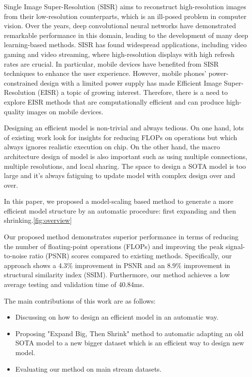 \documentclass[10pt,twocolumn,letterpaper]{article}
\begin{document}
Single Image Super-Resolution (SISR) aims to reconstruct high-resolution images from their low-resolution counterparts, which is an ill-posed problem in computer vision. Over the years, deep convolutional neural networks have demonstrated remarkable performance in this domain, leading to the development of many deep learning-based methods. SISR has found widespread applications, including video gaming and video streaming, where high-resolution displays with high refresh rates are crucial. In particular, mobile devices have benefited from SISR techniques to enhance the user experience. However, mobile phones' power-constrained design with a limited power supply has made Efficient Image Super-Resolution (EISR) a topic of growing interest. Therefore, there is a need to explore EISR methods that are computationally efficient and can produce high-quality images on mobile devices.

Designing an efficient model is non-trivial and always tedious. On one hand, lots of existing work look for insights for reducing FLOPs on operations but which always ignores realistic execution on chip\cite{sandler2018mobilenetv2}\cite{chen2023run}. On the other hand, the macro architecture design of model is also important such as using multiple connections\cite{chollet2017xception}, multiple resolutions\cite{girshick2015fast}, and local sharing\cite{liu2021swin}. The space to design a SOTA model is too large and it's always fatiguing to update model with complex design over and over.

In this paper, we proposed a model-scaling based method to generate a more efficient model structure by an automatic procedure: first expanding and then shrinking.\ref{fig:overview}

Our proposed method demonstrates superior performance in terms of reducing the number of floating-point operations (FLOPs) and improving the peak signal-to-noise ratio (PSNR) scores compared to existing methods. Specifically, our approach shows a 4.3\% improvement in PSNR and an 8.9\% improvement in structural similarity index (SSIM). Furthermore, our method achieves a low average testing and validation time of 40.84ms.

The main contributions of this work are as follows:

\begin{itemize}
    \item Discussing on how to design an efficient model in an automatic way.
    \item Proposing "Expand Big, Then Shrink" method to automatic adapting an old SOTA model to a new bigger dataset which is an efficient way to design new model.
    \item Evaluating our method on main stream datasets.
\end{itemize}
\end{document}
